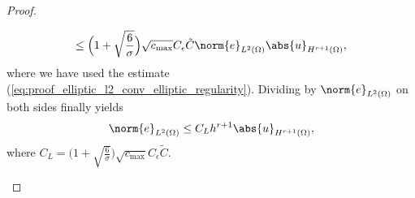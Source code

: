 \begin{proof}
\begin{proofstep}
\begin{equation*}
			\leq \Big(1 + \sqrt{\frac{6}{\sigma}}\Big)\sqrt{c_{\max}} C_{\epsilon} \tilde{C} \norm{e}_{L^2(\Omega)} \abs{u}_{H^{r+1}(\Omega)},
		\end{equation*}
		where we have used the estimate (\ref{eq:proof_elliptic_l2_conv_elliptic_regularity}). Dividing by $\norm{e}_{L^2(\Omega)}$ on both sides finally yields 
		\begin{equation}
			\norm{e}_{L^2(\Omega)} \leq C_{L} h^{r+1} \abs{u}_{H^{r+1}(\Omega)} \nonumber,
		\end{equation}
		where $C_L = \Big(1 + \sqrt{\frac{6}{\sigma}}\Big)\sqrt{c_{\max}} C_{\epsilon} \tilde{C} $. \\
	\end{proofstep}
\end{proof}
